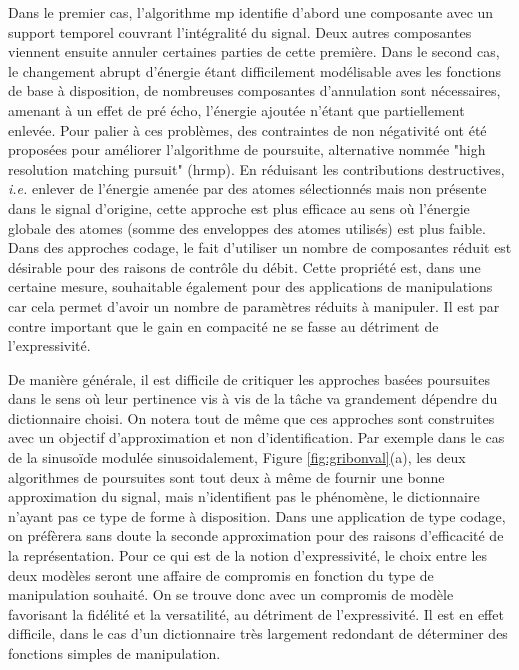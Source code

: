 Dans le premier cas, l'algorithme mp identifie d'abord une composante avec un support temporel couvrant l'intégralité du signal. Deux autres composantes viennent ensuite annuler certaines parties de cette première. Dans le second cas, le changement abrupt d'énergie étant difficilement modélisable aves les fonctions de base à disposition, de nombreuses composantes d'annulation sont nécessaires, amenant à un effet de pré écho, l'énergie ajoutée n'étant que partiellement enlevée. Pour palier à ces problèmes, des contraintes de non négativité ont été proposées pour améliorer l'algorithme de poursuite, alternative nommée "high resolution matching pursuit" (hrmp). En réduisant les contributions destructives, \textit{i.e.} enlever de l'énergie amenée par des atomes sélectionnés mais non présente dans le signal d'origine, cette approche est plus efficace au sens où l'énergie globale des atomes (somme des enveloppes des atomes utilisés) est plus faible. Dans des approches codage, le fait d'utiliser un nombre de composantes réduit est désirable pour des raisons de contrôle du débit. Cette propriété est, dans une certaine mesure, souhaitable également pour des applications de manipulations car cela permet d'avoir un nombre de paramètres réduits à manipuler. Il est par contre important que le gain en compacité ne se fasse au détriment de l'expressivité.



De manière générale, il est difficile de critiquer les approches basées poursuites dans le sens où leur pertinence vis à vis de la tâche va grandement dépendre du dictionnaire choisi. On notera tout de même que ces approches sont construites avec un objectif d'approximation et non d'identification. Par exemple dans le cas de la sinusoïde modulée sinusoidalement, Figure \ref{fig:gribonval}(a), les deux algorithmes de poursuites sont tout deux à même de fournir une bonne approximation du signal, mais \og n'identifient \fg pas le phénomène, le dictionnaire n'ayant pas ce type de forme à disposition. Dans une application de type codage, on préfèrera sans doute la seconde approximation pour des raisons d'efficacité de la représentation. Pour ce qui est de la notion d'expressivité, le choix entre les deux modèles seront une affaire de compromis en fonction du type de manipulation souhaité. On se trouve donc avec un compromis de modèle favorisant la fidélité et la versatilité, au détriment de l'expressivité. Il est en effet difficile, dans le cas d'un dictionnaire très largement redondant de déterminer des fonctions simples de manipulation.

